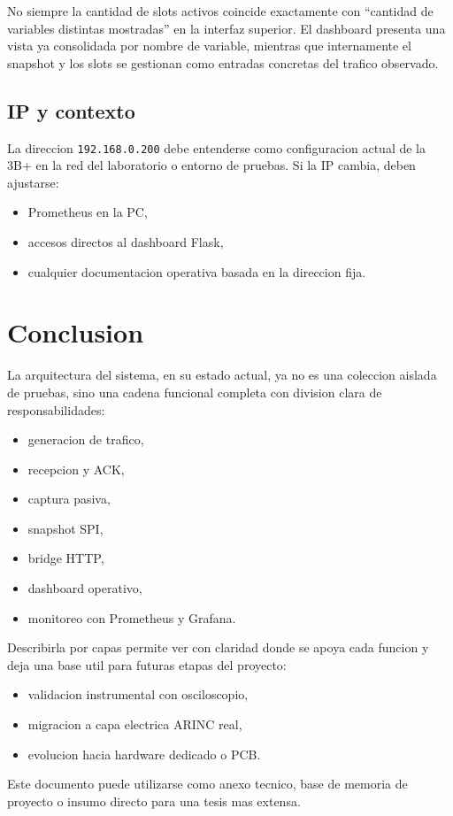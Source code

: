 \documentclass[12pt,a4paper]{report}
\begin{document}
No siempre la cantidad de slots activos coincide exactamente con ``cantidad de variables distintas mostradas'' en la interfaz superior. El dashboard presenta una vista ya consolidada por nombre de variable, mientras que internamente el snapshot y los slots se gestionan como entradas concretas del trafico observado.

\section{IP y contexto}

La direccion \texttt{192.168.0.200} debe entenderse como configuracion actual de la 3B+ en la red del laboratorio o entorno de pruebas. Si la IP cambia, deben ajustarse:

\begin{itemize}
    \item Prometheus en la PC,
    \item accesos directos al dashboard Flask,
    \item cualquier documentacion operativa basada en la direccion fija.
\end{itemize}

\chapter{Conclusion}

La arquitectura del sistema, en su estado actual, ya no es una coleccion aislada de pruebas, sino una cadena funcional completa con division clara de responsabilidades:

\begin{itemize}
    \item generacion de trafico,
    \item recepcion y ACK,
    \item captura pasiva,
    \item snapshot SPI,
    \item bridge HTTP,
    \item dashboard operativo,
    \item monitoreo con Prometheus y Grafana.
\end{itemize}

Describirla por capas permite ver con claridad donde se apoya cada funcion y deja una base util para futuras etapas del proyecto:

\begin{itemize}
    \item validacion instrumental con osciloscopio,
    \item migracion a capa electrica ARINC real,
    \item evolucion hacia hardware dedicado o PCB.
\end{itemize}

Este documento puede utilizarse como anexo tecnico, base de memoria de proyecto o insumo directo para una tesis mas extensa.
\end{document}
